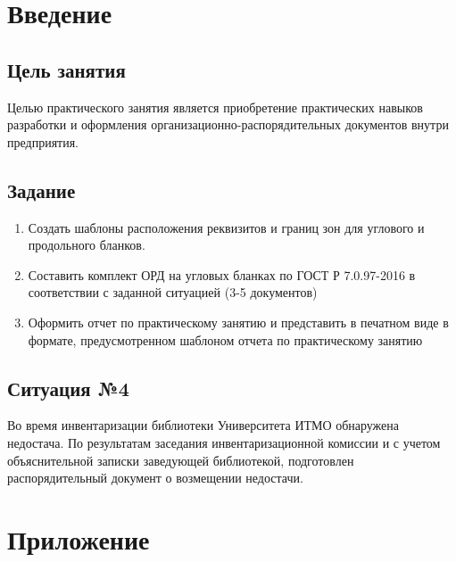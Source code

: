 \chapter{Введение}

\section{Цель занятия}

Целью практического занятия является приобретение практических навыков разработки и оформления организационно-распорядительных документов внутри предприятия.

\section{Задание}
\begin{enumerate}

\item  Создать шаблоны расположения реквизитов и границ зон для углового и продольного бланков.
\item  Составить комплект ОРД на угловых бланках по ГОСТ Р 7.0.97-2016 в соответствии с заданной ситуацией (3-5 документов)
\item  Оформить отчет по практическому занятию и представить в печатном виде в формате, предусмотренном шаблоном отчета по практическому занятию
\end{enumerate}

\section{Ситуация №4}

Во время инвентаризации библиотеки Университета ИТМО обнаружена недостача. По результатам заседания инвентаризационной комиссии и с учетом объяснительной записки заведующей библиотекой, подготовлен распорядительный документ о возмещении недостачи.




\chapter*{Приложение}

